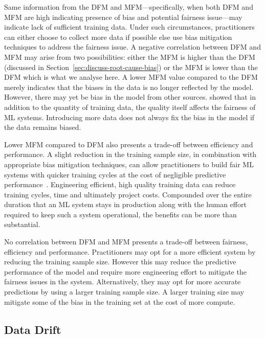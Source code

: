 \documentclass{article}
\begin{document}
Same information from the DFM and MFM---specifically, when both DFM
and MFM are high indicating presence of bias and potential fairness
issue---may indicate lack of sufficient training data. Under such
circumstances, practitioners can either choose to collect more data if
possible else use bias mitigation techniques to address the fairness
issue. A negative correlation between DFM and MFM may arise from two
possibilities: either the MFM is higher than the DFM (discussed in
Section \ref{sec:discuss-root-cause-bias}) or the MFM is lower than
the DFM which is what we analyse here. A lower MFM value compared to
the DFM merely indicates that the biases in the data is no longer
reflected by the model. However, there may yet be bias in the model
from other sources. \citeauthor{zhang2021ignorance} showed that in
addition to the quantity of training data, the quality itself affects
the fairness of ML systems. Introducing more data does not always fix
the bias in the model if the data remains biased.

Lower MFM compared to DFM also presents a trade-off between efficiency
and performance. A slight reduction in the training sample size, in
combination with appropriate bias mitigation techniques, can allow
practitioners to build fair ML systems with quicker training cycles at
the cost of negligible predictive performance \cite{verdecchia2022data}.
Engineering efficient, high quality training data can reduce training
cycles, time and ultimately project costs. Compounded over the entire
duration that an ML system stays in production along with the human
effort required to keep such a system operational, the benefits can be
more than substantial.

No correlation between DFM and MFM presents a trade-off between
fairness, efficiency and performance. Practitioners may opt for a more
efficient system by reducing the training sample size. However this
may reduce the predictive performance of the model and require more
engineering effort to mitigate the fairness issues in the system.
Alternatively, they may opt for more accurate predictions by using a
larger training sample size. A larger training size may mitigate some
of the bias in the training set at the cost of more compute.

\subsection{Data Drift}\label{sec:discuss-data-drift}
\end{document}
